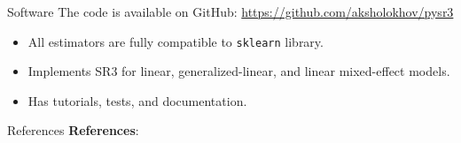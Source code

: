 \documentclass[8pt]{beamer}
\begin{document}
\begin{frame}{Software}
	The code is available on GitHub: \href{github.com/aksholokhov/pysr3}{https://github.com/aksholokhov/pysr3}
	\begin{itemize}
		\item All estimators are fully compatible to \texttt{sklearn} library.
		\item Implements SR3 for linear, generalized-linear, and linear mixed-effect models.
		\item Has tutorials, tests, and documentation.
	\end{itemize}
\end{frame}


\begin{frame}{References}
	\textbf{References}: 
	
	
\end{frame}
\end{document}
